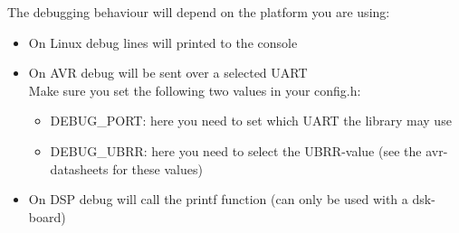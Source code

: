 The debugging behaviour will depend on the platform you are using:
\begin{itemize}
	\item{On Linux debug lines will printed to the console}
	\item{On AVR debug will be sent over a selected UART\\
		Make sure you set the following two values in your config.h:
		\begin{itemize}
			\item{DEBUG\_PORT: here you need to set which UART the library
				may use}
			\item{DEBUG\_UBRR: here you need to select the UBRR-value
				(see the avr-datasheets for these values)}
		\end{itemize}
	}
	\item{On DSP debug will call the printf function
		(can only be used with a dsk-board)}
\end{itemize}
